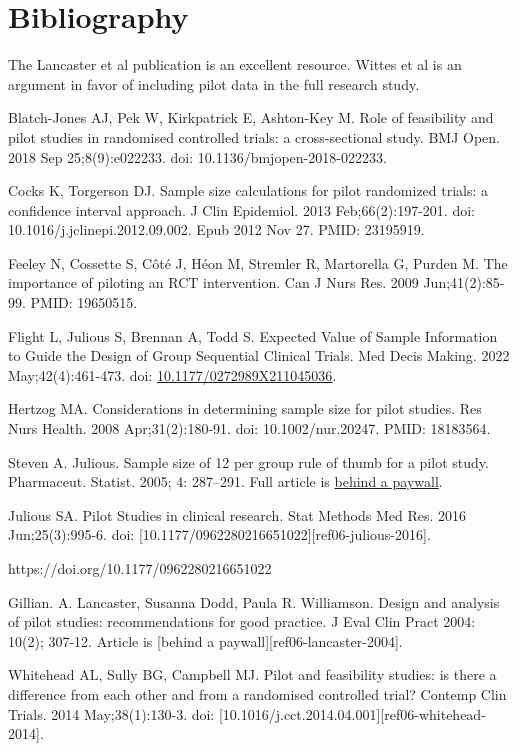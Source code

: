 \documentclass[
  letterpaper,
  DIV=11,
  numbers=noendperiod]{scrreprt}
\begin{document}
\section{Bibliography}\label{bibliography-5}

The Lancaster et al publication is an excellent resource. Wittes et al
is an argument in favor of including pilot data in the full research
study.

Blatch-Jones AJ, Pek W, Kirkpatrick E, Ashton-Key M. Role of feasibility
and pilot studies in randomised controlled trials: a cross-sectional
study. BMJ Open. 2018 Sep 25;8(9):e022233. doi:
10.1136/bmjopen-2018-022233.

Cocks K, Torgerson DJ. Sample size calculations for pilot randomized
trials: a confidence interval approach. J Clin Epidemiol. 2013
Feb;66(2):197-201. doi: 10.1016/j.jclinepi.2012.09.002. Epub 2012 Nov
27. PMID: 23195919.

Feeley N, Cossette S, Côté J, Héon M, Stremler R, Martorella G, Purden
M. The importance of piloting an RCT intervention. Can J Nurs Res. 2009
Jun;41(2):85-99. PMID: 19650515.

Flight L, Julious S, Brennan A, Todd S. Expected Value of Sample
Information to Guide the Design of Group Sequential Clinical Trials. Med
Decis Making. 2022 May;42(4):461-473. doi:
\href{https://doi.org/10.1177/0272989X211045036}{10.1177/0272989X211045036}.

Hertzog MA. Considerations in determining sample size for pilot studies.
Res Nurs Health. 2008 Apr;31(2):180-91. doi: 10.1002/nur.20247. PMID:
18183564.

Steven A. Julious. Sample size of 12 per group rule of thumb for a pilot
study. Pharmaceut. Statist. 2005; 4: 287--291. Full article is
\href{https://doi.org/10.1002/ps}{behind a paywall}.

Julious SA. Pilot Studies in clinical research. Stat Methods Med Res.
2016 Jun;25(3):995-6. doi:
{[}10.1177/0962280216651022{]}{[}ref06-julious-2016{]}.

https://doi.org/10.1177/0962280216651022

Gillian. A. Lancaster, Susanna Dodd, Paula R. Williamson. Design and
analysis of pilot studies: recommendations for good practice. J Eval
Clin Pract 2004: 10(2); 307-12. Article is {[}behind a
paywall{]}{[}ref06-lancaster-2004{]}.

Whitehead AL, Sully BG, Campbell MJ. Pilot and feasibility studies: is
there a difference from each other and from a randomised controlled
trial? Contemp Clin Trials. 2014 May;38(1):130-3. doi:
{[}10.1016/j.cct.2014.04.001{]}{[}ref06-whitehead-2014{]}.
\end{document}
